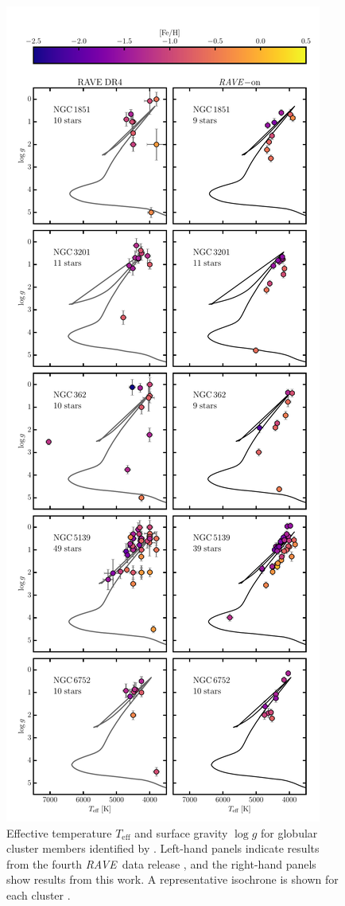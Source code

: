 \documentclass[preprint]{aastex61}
\newcommand{\acronym}[1]{{\small{#1}}}
\newcommand{\project}[1]{\textsl{#1}}
\newcommand{\rave}{\project{\acronym{RAVE}}}
\newcommand{\teff}{T_{\mathrm{eff}}}
\newcommand{\logg}{\log g}
\begin{document}
\begin{figure}[p]
\center
\includegraphics[height=\textheight]{figures/globular-clusters.pdf}
\caption{Effective temperature $\teff$ and surface gravity $\logg$ for globular cluster members identified by \citet{Kunder_2014,Anguiano_2015}.  Left-hand panels indicate results from the fourth \rave\ data release \citep{Kordopatis_2013}, and the right-hand panels show results from this work.  A representative isochrone is shown for each cluster \citep{Bressan_2012}.\label{fig:globular-cluster-HRD}}
\end{figure}
\end{document}
